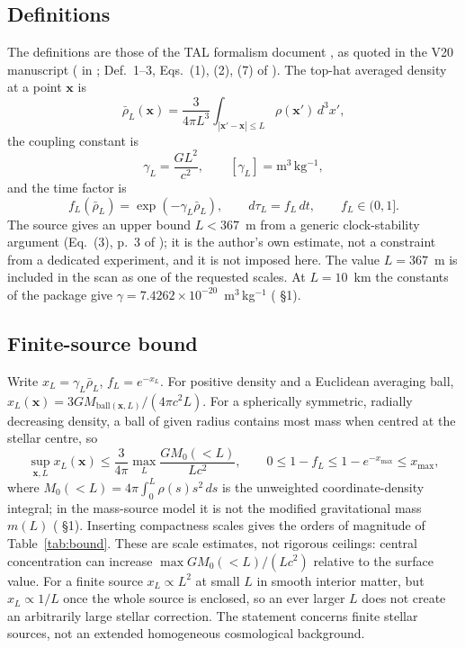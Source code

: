 \documentclass[11pt,a4paper]{article}
\newcommand{\ee}[2]{#1\times10^{#2}}
\begin{document}
\subsection{Definitions}
The definitions are those of the TAL formalism document  \cite{tal}, as quoted in the
V20 manuscript ( in \cite{gh}; Def.~1--3, Eqs.~(1), (2), (7) of \cite{tal}). The top-hat averaged density at a point $\mathbf x$ is
\begin{equation}
\bar\rho_L(\mathbf x)=\frac{3}{4\pi L^3}\int_{|\mathbf x'-\mathbf x|\le L}\rho(\mathbf x')\,d^3x',
\end{equation}
the coupling constant is
\begin{equation}
\gamma_L=\frac{G L^2}{c^2},\qquad [\gamma_L]=\mathrm{m^3\,kg^{-1}},
\end{equation}
and the time factor is
\begin{equation}
f_L(\bar\rho_L)=\exp(-\gamma_L\bar\rho_L),\qquad d\tau_L=f_L\,dt,\qquad f_L\in(0,1].
\end{equation}
The source gives an upper bound $L<367$~m from a generic clock-stability argument (Eq.~(3), p.~3 of \cite{tal});
it is the author's own estimate, not a constraint from a dedicated experiment, and it is not imposed here.
The value $L=367$~m is included in the scan as one of the requested scales. At $L=10$~km the constants of
the package give $\gamma=\ee{7.4262}{-20}$~m$^3$\,kg$^{-1}$ ( \S1).

\subsection{Finite-source bound}
Write $x_L=\gamma_L\bar\rho_L$, $f_L=e^{-x_L}$. For positive density and a Euclidean averaging ball,
$x_L(\mathbf x)=3G M_{\mathrm{ball}(\mathbf x,L)}/(4\pi c^2 L)$. For a spherically symmetric, radially
decreasing density, a ball of given radius contains most mass when centred at the stellar centre, so
\begin{equation}
\sup_{\mathbf x,L}x_L(\mathbf x)\le\frac{3}{4\pi}\max_L\frac{G M_0(<L)}{Lc^2},\qquad
0\le1-f_L\le1-e^{-x_{\max}}\le x_{\max},
\end{equation}
where $M_0(<L)=4\pi\int_0^L\rho(s)s^2\,ds$ is the unweighted coordinate-density integral; in the mass-source
model it is not the modified gravitational mass $m(L)$ ( \S1). Inserting compactness scales
gives the orders of magnitude of Table~\ref{tab:bound}. These are scale estimates, not rigorous ceilings:
central concentration can increase $\max GM_0(<L)/(Lc^2)$ relative to the surface value. For a finite source
$x_L\propto L^2$ at small $L$ in smooth interior matter, but $x_L\propto1/L$ once the whole source is
enclosed, so an ever larger $L$ does not create an arbitrarily large stellar correction. The statement
concerns finite stellar sources, not an extended homogeneous cosmological background.
\end{document}
